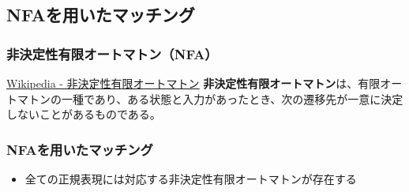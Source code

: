 \documentclass[12pt, unicode, svgnames]{beamer}
\begin{document}
\subsection{NFAを用いたマッチング}
\begin{frame}[fragile]
  \frametitle{非決定性有限オートマトン（NFA）}
  
  \begin{block}{}
    \begin{shadequote}[r]{\scriptsize\href{https://ja.wikipedia.org/wiki/\%E9\%9D\%9E\%E6\%B1\%BA\%E5\%AE\%9A\%E6\%80\%A7\%E6\%9C\%89\%E9\%99\%90\%E3\%82\%AA\%E3\%83\%BC\%E3\%83\%88\%E3\%83\%9E\%E3\%83\%88\%E3\%83\%B3}{Wikipedia - 非決定性有限オートマトン}}
      \textbf{非決定性有限オートマトン}は、有限オートマトンの一種であり、ある状態と入力があったとき、次の遷移先が一意に決定しないことがあるものである。
    \end{shadequote}
  \end{block}

\end{frame}

\begin{frame}[fragile]
  \frametitle{NFAを用いたマッチング}

  \begin{itemize}
    \item 全ての正規表現には対応する非決定性有限オートマトンが存在する
  \end{itemize}
\end{frame}
\end{document}
